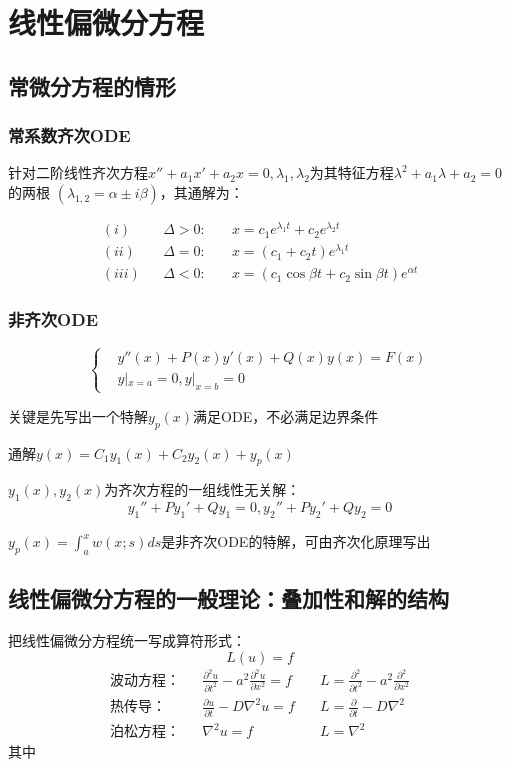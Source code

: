 \newpage
\section{线性偏微分方程}
\subsection{常微分方程的情形}
\subsubsection{常系数齐次ODE}
针对二阶线性齐次方程$x''+a_1x'+a_2x=0, \lambda_1,\lambda_2$为其特征方程$\lambda^2+a_1\lambda+a_2=0$的两根
$(\lambda_{1,2}=\alpha\pm i\beta)$，其通解为：

$$\begin{aligned}
    (i)&&\Delta>0:\quad&x=c_1e^{\lambda_1t}+c_2e^{\lambda_2t}\\
    (ii)&&\Delta=0:\quad&x=(c_1+c_2t)e^{\lambda_1t}\\
    (iii)&&\Delta<0:\quad&x=(c_1\cos\beta t+c_2\sin\beta t)e^{\alpha t}
\end{aligned}$$

\subsubsection{非齐次ODE}
$$\left\{
    \begin{aligned}
    &
    y''(x)+P(x)y'(x)+Q(x)y(x)=F(x)\\
    &y|_{x=a}=0,y|_{x=b}=0
            \end{aligned}
    \right.$$

    关键是先写出一个特解$y_p(x)$满足ODE，不必满足边界条件
    
    通解$y(x)=C_1y_1(x)+C_2y_2(x)+y_p(x)$

    $y_1(x),y_2(x)$为齐次方程的一组线性无关解：
$$y_1''+Py_1'+Qy_1=0,y_2''+Py_2'+Qy_2=0$$

$y_p(x)=\int_a^xw(x;s)ds$是非齐次ODE的特解，可由齐次化原理写出

\subsection{线性偏微分方程的一般理论：叠加性和解的结构}
把线性偏微分方程统一写成算符形式：
$$L(u)=f$$
$$\begin{aligned}
    \text{波动方程：}&&\frac {\partial ^2u}{\partial t^2}- a^2\frac {\partial ^2u}{\partial x^2}=f
    &\quad L=\frac{\partial^2}{\partial t^2}-a^2\frac{\partial^2}{\partial x^2}\\
    \text{热传导：}&&\frac{\partial{u}}{\partial{t}}-D\nabla^2u=f
    &\quad L=\frac\partial{\partial t}-D\nabla^2\\
    \text{泊松方程：}&&\nabla^2u=f
    &\quad L=\nabla^2
\end{aligned}$$
其中

